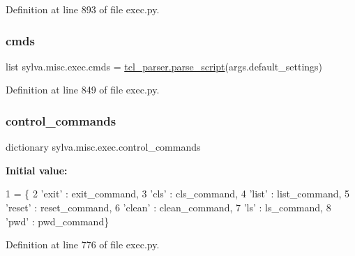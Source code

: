Definition at line 893 of file exec.\+py.

\mbox{\label{namespacesylva_1_1misc_1_1exec_a4c36666d7d4852a6684f769a8bc916f4}} 
\subsubsection{\texorpdfstring{cmds}{cmds}}
{\footnotesize\ttfamily list sylva.\+misc.\+exec.\+cmds = \hyperlink{namespacesylva_1_1misc_1_1tcl__parser_aab59812e931f24c8e7d1cbffd2fe587e}{tcl\+\_\+parser.\+parse\+\_\+script}(args.\+default\+\_\+settings)}



Definition at line 849 of file exec.\+py.

\mbox{\label{namespacesylva_1_1misc_1_1exec_ad240a67608e9c967e361585ab8412a98}} 
\subsubsection{\texorpdfstring{control\+\_\+commands}{control\_commands}}
{\footnotesize\ttfamily dictionary sylva.\+misc.\+exec.\+control\+\_\+commands}

{\bfseries Initial value\+:}
\begin{DoxyCode}
1 =  \{
2   \textcolor{stringliteral}{'exit'} : exit\_command,
3   \textcolor{stringliteral}{'cls'} : cls\_command,
4   \textcolor{stringliteral}{'list'} : list\_command,
5   \textcolor{stringliteral}{'reset'} : reset\_command,
6   \textcolor{stringliteral}{'clean'} : clean\_command,
7   \textcolor{stringliteral}{'ls'} : ls\_command,
8   \textcolor{stringliteral}{'pwd'} : pwd\_command\}
\end{DoxyCode}


Definition at line 776 of file exec.\+py.

\mbox{\label{namespacesylva_1_1misc_1_1exec_abb9ca065b61fa23e0f7235833304ebc8}} 

